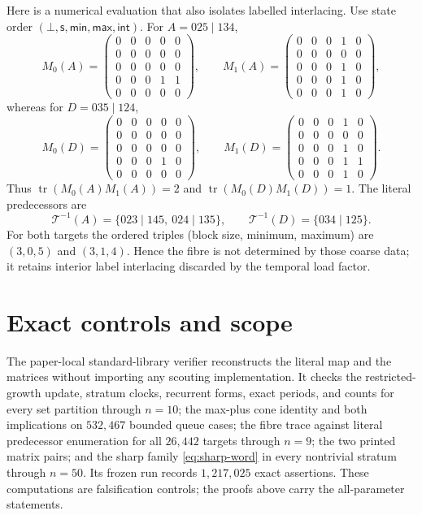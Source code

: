 \documentclass[a4paper,10pt]{amsart}
\theoremstyle{definition}
\theoremstyle{remark}
\newcommand{\T}{\mathcal T}
\newcommand{\tr}{\operatorname{tr}}
\newcommand{\botstate}{\bot}
\begin{document}
Here is a numerical evaluation that also isolates labelled interlacing.  Use
state order $(\botstate,\mathsf{s},\mathsf{min},\mathsf{max},\mathsf{int})$.
For $A=025\mid134$,
\[
 M_0(A)=\begin{pmatrix}
0&0&0&0&0\\0&0&0&0&0\\0&0&0&0&0\\0&0&0&1&1\\0&0&0&0&0
\end{pmatrix},\qquad
 M_1(A)=\begin{pmatrix}
0&0&0&1&0\\0&0&0&0&0\\0&0&0&1&0\\0&0&0&1&0\\0&0&0&1&0
\end{pmatrix},
\]
whereas for $D=035\mid124$,
\[
 M_0(D)=\begin{pmatrix}
0&0&0&0&0\\0&0&0&0&0\\0&0&0&0&0\\0&0&0&1&0\\0&0&0&0&0
\end{pmatrix},\qquad
 M_1(D)=\begin{pmatrix}
0&0&0&1&0\\0&0&0&0&0\\0&0&0&1&0\\0&0&0&1&1\\0&0&0&1&0
\end{pmatrix}.
\]
Thus $\tr(M_0(A)M_1(A))=2$ and
$\tr(M_0(D)M_1(D))=1$.  The literal predecessors are
\[
 \T^{-1}(A)=\{023\mid145,\ 024\mid135\},\qquad
 \T^{-1}(D)=\{034\mid125\}.
\]
For both targets the ordered triples (block size, minimum, maximum) are
$(3,0,5)$ and $(3,1,4)$.  Hence the fibre is not determined by those coarse
data; it retains interior label interlacing discarded by the temporal load
factor.

\section{Exact controls and scope}

The paper-local standard-library verifier reconstructs the literal map and
the matrices without importing any scouting implementation.  It checks the
restricted-growth update, stratum clocks, recurrent forms, exact periods, and
counts for every set partition through $n=10$; the max-plus cone identity and
both implications on $532{,}467$ bounded queue cases; the fibre trace against
literal predecessor enumeration for all $26{,}442$ targets through $n=9$;
the two printed matrix pairs; and the sharp family \eqref{eq:sharp-word} in
every nontrivial stratum through $n=50$.  Its frozen run records
$1{,}217{,}025$ exact assertions.  These computations are falsification
controls; the proofs above carry the all-parameter statements.
\end{document}
